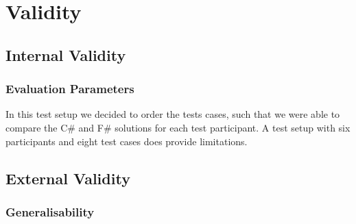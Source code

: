 \section{Validity} \label{sec:validity}

\subsection{Internal Validity}

\subsubsection{Evaluation Parameters}
In this test setup we decided to order the tests cases, such that we were able to compare the C\# and F\# solutions for each test participant. A test setup with six participants and eight test cases does provide limitations. 

\subsection{External Validity}


\subsubsection{Generalisability}

